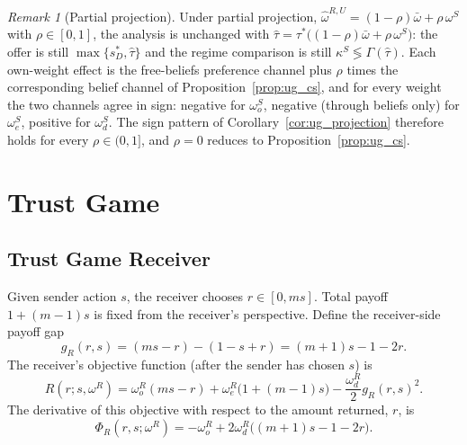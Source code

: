 \documentclass[11pt]{article}
\theoremstyle{plain}
\theoremstyle{remark}
\newtheorem{remark}{Remark}
\begin{document}
\begin{remark}[Partial projection]
Under partial projection, $\hat\omega^{R,U}=(1-\rho)\bar\omega+\rho\,\omega^S$ with $\rho\in[0,1]$, the analysis is unchanged with $\hat\tau=\tau^\ast\big((1-\rho)\bar\omega+\rho\,\omega^S\big)$: the offer is still $\max\{s_D^\ast,\hat\tau\}$ and the regime comparison is still $\kappa^S\lessgtr\Gamma(\hat\tau)$.  Each own-weight effect is the free-beliefs preference channel plus $\rho$ times the corresponding belief channel of Proposition~\ref{prop:ug_cs}, and for every weight the two channels agree in sign: negative for $\omega_o^S$, negative (through beliefs only) for $\omega_e^S$, positive for $\omega_d^S$.  The sign pattern of Corollary~\ref{cor:ug_projection} therefore holds for every $\rho\in(0,1]$, and $\rho=0$ reduces to Proposition~\ref{prop:ug_cs}.
\end{remark}

\section{Trust Game}
\label{sec:trust}

\subsection{Trust Game Receiver}

Given sender action $s$, the receiver chooses $r\in[0,ms]$.  Total payoff $1+(m-1)s$ is fixed from the receiver's perspective.  Define the receiver-side payoff gap
\[
        g_R(r,s)=(ms-r)-(1-s+r)=(m+1)s-1-2r.
\]
The receiver's objective function (after the sender has chosen $s$) is
\begin{equation}
\label{eq:R_return_objective}
        R(r;s,\omega^R)
        =
        \omega_o^R(ms-r)
        +\omega_e^R\big(1+(m-1)s\big)
        -\frac{\omega_d^R}{2}g_R(r,s)^2.
\end{equation}
The derivative of this objective with respect to the amount returned, $r$, is
\begin{equation}
\label{eq:R_return_phi}
        \Phi_R(r,s;\omega^R)
        =
        -\omega_o^R
        +2\omega_d^R\big((m+1)s-1-2r\big).
\end{equation}
\end{document}
